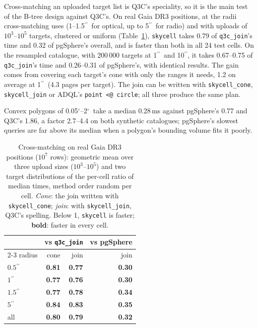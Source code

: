 \documentclass[final,5p,times,twocolumn,authoryear]{elsarticle}
\newcommand{\arcsec}{\ensuremath{^{\prime\prime}}}
\newcommand{\degr}{\ensuremath{^{\circ}}}
\begin{document}
Cross-matching an uploaded target list is Q3C's speciality, so it is the main test of
the B-tree design against Q3C's. On real Gaia DR3 positions, at the radii cross-matching
uses (1--1.5\arcsec\ for optical, up to 5\arcsec\ for radio) and with uploads of
$10^3$--$10^5$ targets, clustered or uniform (Table~\ref{tab:xmreal}), \texttt{skycell}
takes 0.79 of \texttt{q3c\_join}'s time and 0.32 of pgSphere's overall, and is faster
than both in all 24 test cells. On the resampled catalogue, with 200\,000 targets at
1\arcsec\ and 10\arcsec, it takes 0.67--0.75 of \texttt{q3c\_join}'s time and
0.26--0.31 of pgSphere's, with identical results. The gain comes from covering each
target's cone with only the ranges it needs, 1.2 on average at 1\arcsec\ (4.3 pages per
target). The join can be written with \texttt{skycell\_cone}, \texttt{skycell\_join} or
ADQL's \texttt{point <@ circle}; all three produce the same plan.

Convex polygons of 0.05\degr--2\degr\ take a median 0.28\,ms against pgSphere's 0.77 and
Q3C's 1.86, a factor 2.7--4.4 on both synthetic catalogues; pgSphere's slowest queries
are far above its median when a polygon's bounding volume fits it poorly.

\begin{table}
  \caption{Cross-matching on real Gaia DR3 positions ($10^7$ rows): geometric mean over
    three upload sizes ($10^3$--$10^5$) and two target distributions of the per-cell
    ratio of median times, method order random per cell. \emph{Cone}: the join written
    with \texttt{skycell\_cone}; \emph{join}: with \texttt{skycell\_join}, Q3C's
    spelling. Below 1, \texttt{skycell} is faster; \textbf{bold}: faster in every cell.}
  \label{tab:xmreal}
  \centering
  \footnotesize
  \begin{tabular}{l rr r}
    \hline\hline
    & \multicolumn{2}{c}{vs \texttt{q3c\_join}} & vs pgSphere \\
    \cline{2-3}\cline{4-4}
    radius & cone & join & join \\
    \hline
    $0.5\arcsec$ & \textbf{0.81} & \textbf{0.77} & \textbf{0.30} \\
    $1\arcsec$   & \textbf{0.77} & \textbf{0.76} & \textbf{0.30} \\
    $1.5\arcsec$ & \textbf{0.77} & \textbf{0.78} & \textbf{0.34} \\
    $5\arcsec$   & \textbf{0.84} & \textbf{0.83} & \textbf{0.35} \\
    \hline
    all          & \textbf{0.80} & \textbf{0.79} & \textbf{0.32} \\
    \hline
  \end{tabular}
\end{table}
\end{document}
